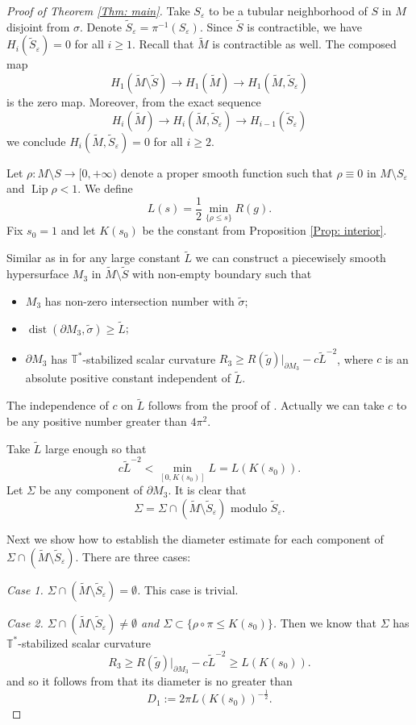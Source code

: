 \documentclass[11pt, reqno]{amsart}
\numberwithin{equation}{section}
\theoremstyle{definition}
\DeclareMathOperator{\Lip}{Lip}
\DeclareMathOperator{\dist}{dist}
\newcommand{\ve}{\varepsilon}
\newcommand{\ti}[1]{\tilde{#1}}
\begin{document}
\begin{proof}[Proof of Theorem \ref{Thm: main}]
Take $S_\ve$ to be a tubular neighborhood of $S$ in $M$ disjoint from $\sigma$. Denote $\tilde S_\ve=\pi^{-1}(S_\ve)$. Since $\tilde S$ is contractible, we have $H_i(\tilde S_\ve)=0$ for all $i\geq 1$. Recall that $\tilde M$ is contractible as well. The composed map
$$H_1(\ti M \setminus \ti S) \to  H_1(\ti M) \to H_1(\tilde M,\tilde S_{\ve})$$
is the zero map. Moreover, from the exact sequence
$$
H_i(\tilde M)\to H_i(\tilde M,\tilde S_\ve)\to H_{i-1}(\tilde S_\ve)
$$
we conclude $H_i(\tilde M,\tilde S_\ve)=0$ for all $i\geq 2$.

Let $\rho:M\setminus S\to [0,+\infty)$ denote a proper smooth function such that $\rho\equiv 0$ in $M\setminus S_\ve$ and $\Lip\rho <1$. We define
$$
L(s)=\frac{1}{2}\min_{\{\rho\leq s\}} R(g).
$$
Fix $s_0=1$ and let $K(s_0)$ be the constant from Proposition \ref{Prop: interior}.

Similar as in \cite[Section 3.1]{CCZ23} for any large constant $\tilde L$ we can construct a piecewisely smooth hypersurface $M_3$ in $\tilde M\setminus \tilde S$ with non-empty boundary such that
\begin{itemize}\setlength{\itemsep}{1mm}
\item $M_3$ has non-zero intersection number with $\tilde \sigma$;
\item $\dist(\partial M_3,\tilde \sigma)\geq \tilde L$;
\item $\partial M_3$ has $\mathbb{T}^*$-stabilized scalar curvature $R_3\geq R(\tilde g)|_{\partial M_3}-c\tilde L^{-2}$, where $c$ is an absolute positive constant independent of $\tilde L$.
\end{itemize}
The independence of $c$ on $\tilde L$ follows from the proof of \cite[Lemma 3.3]{CCZ23}. Actually we can take $c$ to be any positive number greater than $4 \pi^2$.

Take $\tilde L$ large enough so that
$$
c\tilde L^{-2}< \min_{[0,K(s_0)]}L = L(K(s_0)).
$$
Let $\Sigma$ be any component of $\partial M_3$. It is clear that
$$
\Sigma = \Sigma\cap (\tilde M\setminus \tilde S_\ve) \mbox{ modulo }\tilde S_\ve.
$$

Next we show how to establish the diameter estimate for each component of $\Sigma\cap (\tilde M\setminus \tilde S_\ve)$. There are three cases:

\medskip

{\it Case 1. $\Sigma\cap (\tilde M\setminus \tilde S_\ve)=\emptyset$.} This case is trivial.

\medskip

{\it Case 2. $\Sigma\cap (\tilde M\setminus \tilde S_\ve)\neq \emptyset$ and $\Sigma\subset \{\rho\circ \pi\leq K(s_0)\}$.} Then we know that $\Sigma$ has $\mathbb{T}^*$-stabilized scalar curvature
$$
R_3\geq R(\tilde g)|_{\partial M_3}-c\tilde L^{-2}\geq L(K(s_0)).
$$
and so it follows from \cite{Gro20} that its diameter is no greater than
$$
D_1:=2\pi L(K(s_0))^{-\frac{1}{2}}.
$$


\end{proof}
\end{document}
